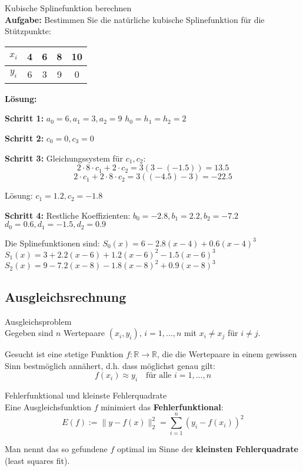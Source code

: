 \begin{example2}{Kubische Splinefunktion berechnen}\\
\textbf{Aufgabe:} Bestimmen Sie die natürliche kubische Splinefunktion für die Stützpunkte:
\begin{center}
\begin{tabular}{|c|c|c|c|c|}
\hline
$x_i$ & 4 & 6 & 8 & 10 \\
\hline
$y_i$ & 6 & 3 & 9 & 0 \\
\hline
\end{tabular}
\end{center}
\tcblower
\textbf{Lösung:}

\textbf{Schritt 1:} $a_0 = 6, a_1 = 3, a_2 = 9$
$h_0 = h_1 = h_2 = 2$

\textbf{Schritt 2:} $c_0 = 0, c_3 = 0$

\textbf{Schritt 3:} Gleichungssystem für $c_1, c_2$:
$$2 \cdot 8 \cdot c_1 + 2 \cdot c_2 = 3(3 - (-1.5)) = 13.5$$
$$2 \cdot c_1 + 2 \cdot 8 \cdot c_2 = 3((-4.5) - 3) = -22.5$$

Lösung: $c_1 = 1.2, c_2 = -1.8$

\textbf{Schritt 4:} Restliche Koeffizienten:
$b_0 = -2.8, b_1 = 2.2, b_2 = -7.2$
$d_0 = 0.6, d_1 = -1.5, d_2 = 0.9$

Die Splinefunktionen sind:
$S_0(x) = 6 - 2.8(x-4) + 0.6(x-4)^3$
$S_1(x) = 3 + 2.2(x-6) + 1.2(x-6)^2 - 1.5(x-6)^3$
$S_2(x) = 9 - 7.2(x-8) - 1.8(x-8)^2 + 0.9(x-8)^3$
\end{example2}

\subsection{Ausgleichsrechnung}

\begin{definition}{Ausgleichsproblem}\\
Gegeben sind $n$ Wertepaare $(x_i, y_i)$, $i = 1, ..., n$ mit $x_i \neq x_j$ für $i \neq j$.

Gesucht ist eine stetige Funktion $f: \mathbb{R} \rightarrow \mathbb{R}$, die die Wertepaare in einem gewissen Sinn bestmöglich annähert, d.h. dass möglichst genau gilt:
$$f(x_i) \approx y_i \quad \text{für alle } i = 1, ..., n$$
\end{definition}

\begin{concept}{Fehlerfunktional und kleinste Fehlerquadrate}\\
Eine Ausgleichsfunktion $f$ minimiert das \textbf{Fehlerfunktional}:
$$E(f) := \|y - f(x)\|_2^2 = \sum_{i=1}^{n} (y_i - f(x_i))^2$$

Man nennt das so gefundene $f$ optimal im Sinne der \textbf{kleinsten Fehlerquadrate} (least squares fit).
\end{concept}

